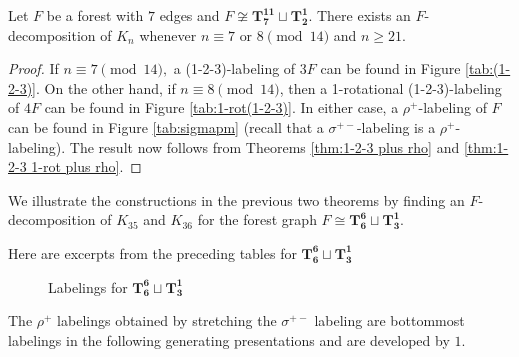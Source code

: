 \begin{thm}\label{thm:7 or 8 mod 14}
    Let $F$ be a forest with $7$ edges and $F \not \cong \mathbf{T_{7}^{11}}\sqcup\mathbf{T_{2}^{1}}$. There exists an $F$-decomposition of $K_n$ whenever $n \equiv 7 \textrm{ or } 8 \pmod{14}$ and $n \geq 21.$
\end{thm}
\begin{proof}
    If $n \equiv 7 \pmod{14},$ a (1-2-3)-labeling of $3F$ can be found in Figure \ref{tab:(1-2-3)}. On the other hand, if $n \equiv 8 \pmod{14}$, then a 1-rotational (1-2-3)-labeling of $4F$ can be found in Figure \ref{tab:1-rot(1-2-3)}. In either case, a $\rho^{+}$-labeling of $F$ can be found in Figure \ref{tab:sigmapm} (recall that a $\sigma^{+-}$-labeling is a $\rho^{+}$-labeling). The result now follows from Theorems \ref{thm:1-2-3 plus rho} and \ref{thm:1-2-3 1-rot plus rho}.
\end{proof}
\begin{example}
We illustrate the constructions in the previous two theorems by finding an $F$-decomposition of $K_{35}$ and $K_{36}$ for the forest graph $F \cong \mathbf{T_{6}^{6}} \sqcup \mathbf{T_{3}^{1}}$.\newline

\noindent Here are excerpts from the preceding tables for $\mathbf{T_{6}^{6}} \sqcup \mathbf{T_{3}^{1}}$

\begin{figure}[H]
\centering
        \scalebox{0.6}{}
        \caption{Labelings for $\mathbf{T_{6}^{6}} \sqcup \mathbf{T_{3}^{1}}$}
        \label{fig:example chart}
\end{figure}

The $\rho^{+}$ labelings obtained by stretching the $\sigma^{+-}$ labeling are bottommost labelings in the following generating presentations and are developed by $1$.
\end{example}

        
        
